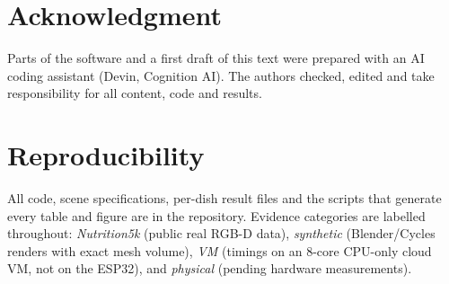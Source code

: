 \documentclass[conference]{IEEEtran}
\begin{document}
\section*{Acknowledgment}
Parts of the software and a first draft of this text were prepared with an AI
coding assistant (Devin, Cognition AI). The authors checked, edited and take
responsibility for all content, code and results.

\section*{Reproducibility}
All code, scene specifications, per-dish result files and the scripts that
generate every table and figure are in the repository. Evidence categories are
labelled throughout: \emph{Nutrition5k} (public real RGB-D data),
\emph{synthetic} (Blender/Cycles renders with exact mesh volume), \emph{VM}
(timings on an 8-core CPU-only cloud VM, not on the ESP32), and
\emph{physical} (pending hardware measurements).



\end{document}
